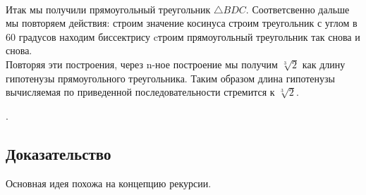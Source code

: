 \documentclass[12pt, letterpaper, oneside]{report}
\begin{document}
\begin{enumerate}
\begin{figure}[h]
	\caption{}
	\label{fig:bdc}
\end{figure}\\
Итак мы получили прямоугольный треугольник $\triangle BDC$. Соответсвенно дальше мы повторяем действия: 
\subitem строим значение косинуса
\subitem строим треугольник с углом в 60 градусов
\subitem находим биссектрису
\subitem cтроим прямоугольный треугольник 
 так снова и снова.\\
Повторяя эти построения, через n-ное построение мы получим $\sqrt[3]{2}$ как длину гипотенузы прямоугольного треугольника. Таким образом длина гипотенузы вычисляемая по приведенной последовательности стремится к $\sqrt[3]{2}$.
\newpage

\end{enumerate}.

\subsection{Доказательство} 


Основная идея похожа на концепцию рекурсии.\\
 
\end{document}
